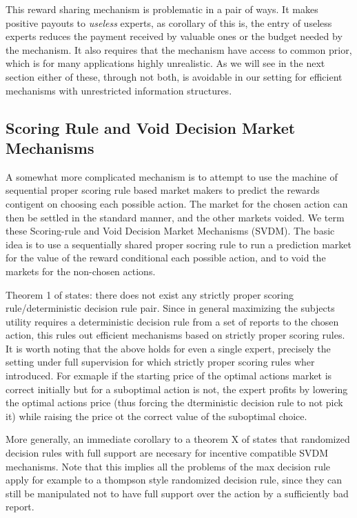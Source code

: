 This reward sharing mechanism is problematic in a pair of ways. It makes positive payouts to  \emph{useless} experts, as corollary of this is, the entry of useless experts reduces the payment received by valuable ones or the budget needed by the mechanism. It also requires that the mechanism have access to common prior, which is for many applications highly unrealistic. 
As we will see in the next section either of these, through not both, is avoidable in our setting for efficient mechanisms with unrestricted information structures. 



\subsection{Scoring Rule and Void Decision Market Mechanisms}


A somewhat more complicated mechanism is to attempt to use the machine of sequential proper scoring rule based market makers to predict the rewards contigent on choosing each possible action. The market for the chosen action can then be settled in the standard manner, and the other markets voided. 
We term these Scoring-rule and Void Decision Market Mechanisms (SVDM). The basic idea is to use a sequentially shared proper socring rule to run a prediction market for the value of the reward conditional each possible action, and to void the markets for the non-chosen actions.  

Theorem 1 of \cite{othman2010decision} states: there does not exist any strictly proper scoring rule/deterministic decision rule pair.
Since in general maximizing the subjects utility requires a deterministic decision rule from a set of reports to the chosen action, this rules out efficient mechanisms based on strictly proper scoring rules. 
It is worth noting that the above holds for even a single expert, precisely the setting under full supervision for which strictly proper scoring rules wher introduced. 
For exmaple if the starting price of the optimal actions market is correct initially but for a suboptimal action is not, the expert profits by lowering the optimal actions price (thus forcing the dterministic decision rule to not pick it) while raising the price ot the correct value of the suboptimal choice. 

More generally, an immediate corollary to a theorem X of \cite{chen2014eliciting} states that randomized decision rules with full support are necesary for incentive compatible SVDM mechanisms.
Note that this implies all the problems of the max decision rule apply for example to a thompson style randomized decision rule, since they can still be manipulated not to have full support over the action by a sufficiently bad report.

